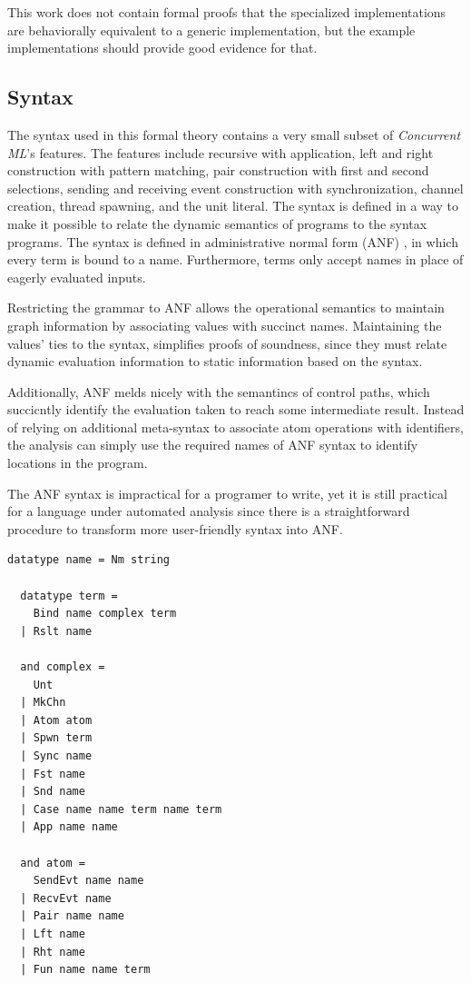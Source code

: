 \documentclass[letterpaper, 11pt]{extarticle}
\begin{document}
This work does not contain formal proofs that the specialized implementations are
behaviorally equivalent to a generic implementation, but the example implementations
should provide good evidence for that.

\subsection{Syntax}
The syntax used in this formal theory contains a very small subset of
\textit{Concurrent ML}'s features. The features include recursive  with
application, left and right construction with pattern matching, pair construction with first
and second selections, sending and receiving event construction with synchronization,
channel creation, thread spawning, and the unit literal. The syntax is defined in a way to
make it possible to relate the dynamic semantics of programs to the syntax programs.
The syntax is defined in administrative normal form (ANF) \cite{flanagan1993essence}, in which every term
is bound to a name. Furthermore, terms only accept names in place of eagerly evaluated
inputs. 

Restricting the grammar to ANF allows the operational semantics
to maintain graph information by associating values with succinct names.
Maintaining the values' ties to the syntax,
simplifies proofs of soundness, since they must relate dynamic evaluation information
to static information based on the syntax.

Additionally, ANF melds nicely with the semantincs of control paths, which succicntly identify
the evaluation taken to reach some intermediate result.
Instead of relying on additional meta-syntax to associate atom operations with identifiers,
the analysis can simply use the required names of ANF syntax to identify locations in the program.

The ANF syntax is impractical for a programer to write,
yet it is still practical for a language under automated analysis
since there is a straightforward procedure to transform
more user-friendly syntax into ANF.

\begin{lstlisting}[language=logic]
  datatype name = Nm string

  datatype term = 
    Bind name complex term 
  | Rslt name

  and complex = 
    Unt
  | MkChn
  | Atom atom
  | Spwn term 
  | Sync name
  | Fst name
  | Snd name
  | Case name name term name term 
  | App name name

  and atom = 
    SendEvt name name
  | RecvEvt name
  | Pair name name
  | Lft name
  | Rht name
  | Fun name name term 
\end{lstlisting}
\end{document}
